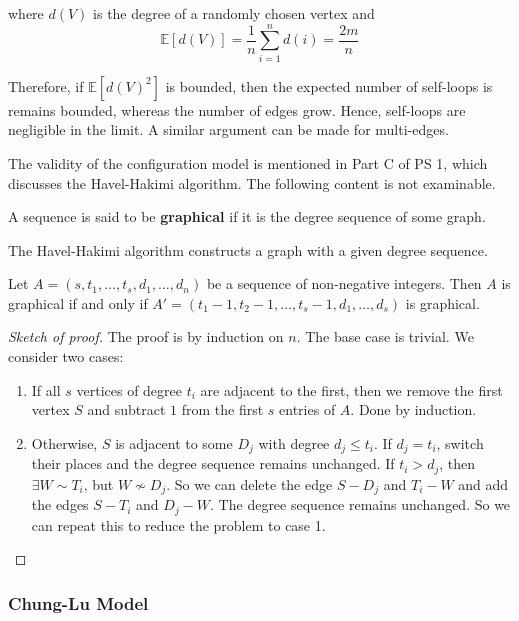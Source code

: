 \documentclass{article}
\begin{document}
where $d(V)$ is the degree of a randomly chosen vertex and 
\begin{equation*}
    \mathbb{E}[d(V)] = \frac{1}{n} \sum_{i=1}^{n} d(i) = \frac{2m}{n}
\end{equation*}

Therefore, if $\mathbb{E}[d(V)^{2}]$ is bounded, then the expected number of self-loops is remains bounded, whereas the number of edges grow. Hence, self-loops are negligible in the limit. A similar argument can be made for multi-edges.  

\begin{unexaminable}
    The validity of the configuration model is mentioned in Part C of PS 1, which discusses the Havel-Hakimi algorithm. The following content is not examinable.
\end{unexaminable}

\begin{definition}
    A sequence is said to be \textbf{graphical} if it is the degree sequence of some graph.
\end{definition}

The Havel-Hakimi algorithm constructs a graph with a given degree sequence.
\begin{theorem}
    Let $A=(s, t_1, \ldots, t_s, d_1, \ldots, d_n)$ be a sequence of non-negative integers. Then $A$ is graphical if and only if $A'=(t_1-1, t_2-1, \ldots, t_s-1, d_1, \ldots, d_s)$ is graphical.
\end{theorem}
\begin{proof}[Sketch of proof]
    The proof is by induction on $n$. The base case is trivial. We consider two cases: 
    \begin{enumerate}
        \item If all $s$ vertices of degree $t_i$ are adjacent to the first, then we remove the first vertex $S$ and subtract $1$ from the first $s$ entries of $A$. Done by induction.
        \item Otherwise, $S$ is adjacent to some $D_j$ with degree $d_j \leq t_i$. If $d_j=t_i$, switch their places and the degree sequence remains unchanged. If $t_i>d_j$, then $\exists W \sim T_i$, but $W \nsim D_j$. So we can delete the edge $S-D_j$ and $T_i-W$ and add the edges $S-T_i$ and $D_j-W$. The degree sequence remains unchanged. So we can repeat this to reduce the problem to case 1.
    \end{enumerate}
\end{proof}


\subsubsection{Chung-Lu Model}
\end{document}
